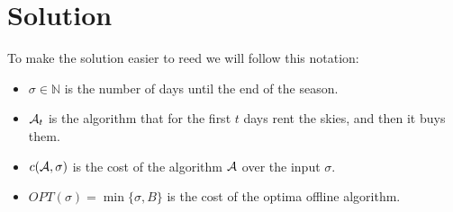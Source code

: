 \documentclass[11pt]{article}
\begin{document}
\section*{Solution}
To make the solution easier to reed we will follow this notation:
\begin{itemize}
    \item $\sigma \in \mathbb{N}$ is the number of days until the end of the season. 
    \item $\mathcal{A}_t$ is the algorithm that for the first $t$ days rent the skies, and then it buys them. 
    \item $c(\mathcal{A}, \sigma)$ is the cost of the algorithm $\mathcal{A}$ over the input $\sigma$. 
    \item $OPT(\sigma) = \min\{\sigma, B\}$ is the cost of the optima offline algorithm. 
\end{itemize}
\end{document}
